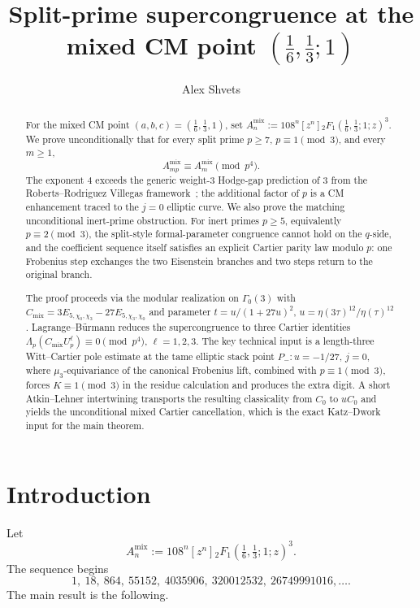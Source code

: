 \documentclass[11pt]{amsart}
\title[Split-prime supercongruence at the mixed CM point]{Split-prime supercongruence at the mixed CM point $(\tfrac16,\tfrac13;1)$}
\author{Alex Shvets}
\date{}
\theoremstyle{definition}
\theoremstyle{remark}
\begin{document}
\begin{abstract}
For the mixed CM point $(a,b,c)=(\tfrac16,\tfrac13,1)$, set
$A_n^{\mathrm{mix}}:=108^n[z^n]{}_2F_1(\tfrac16,\tfrac13;1;z)^3$. We prove unconditionally that for every split prime $p\ge 7$, $p\equiv 1\pmod 3$, and every $m\ge 1$,
\[
A_{mp}^{\mathrm{mix}}\equiv A_m^{\mathrm{mix}}\pmod{p^4}.
\]
The exponent $4$ exceeds the generic weight-$3$ Hodge-gap prediction of $3$ from the Roberts--Rodriguez Villegas framework~\cite{RRV}; the additional factor of $p$ is a CM enhancement traced to the $j=0$ elliptic curve. We also prove the matching unconditional inert-prime obstruction. For inert primes $p\ge 5$, equivalently $p\equiv 2\pmod 3$, the split-style formal-parameter congruence cannot hold on the $q$-side, and the coefficient sequence itself satisfies an explicit Cartier parity law modulo $p$: one Frobenius step exchanges the two Eisenstein branches and two steps return to the original branch.

The proof proceeds via the modular realization on $\Gamma_0(3)$ with $C_{\mathrm{mix}}=3E_{5,\chi_0,\chi_3}-27E_{5,\chi_3,\chi_0}$ and parameter $t=u/(1+27u)^2$, $u=\eta(3\tau)^{12}/\eta(\tau)^{12}$. Lagrange--B\"urmann reduces the supercongruence to three Cartier identities $\Lambda_p(C_{\mathrm{mix}}U_p^\ell)\equiv 0\pmod{p^4}$, $\ell=1,2,3$. The key technical input is a length-three Witt--Cartier pole estimate at the tame elliptic stack point $P_-:u=-1/27$, $j=0$, where $\mu_3$-equivariance of the canonical Frobenius lift, combined with $p\equiv 1\pmod 3$, forces $K\equiv 1\pmod 3$ in the residue calculation and produces the extra digit. A short Atkin--Lehner intertwining transports the resulting classicality from $C_0$ to $uC_0$ and yields the unconditional mixed Cartier cancellation, which is the exact Katz--Dwork input for the main theorem.
\end{abstract}

\maketitle

\section{Introduction}\label{sec:intro}

Let
\[
A_n^{\mathrm{mix}}:=108^n[z^n]{}_2F_1\!\left(\tfrac16,\tfrac13;1;z\right)^3.
\]
The sequence begins
\[
1,\ 18,\ 864,\ 55152,\ 4035906,\ 320012532,\ 26749991016,\ldots .
\]
The main result is the following.
\end{document}
